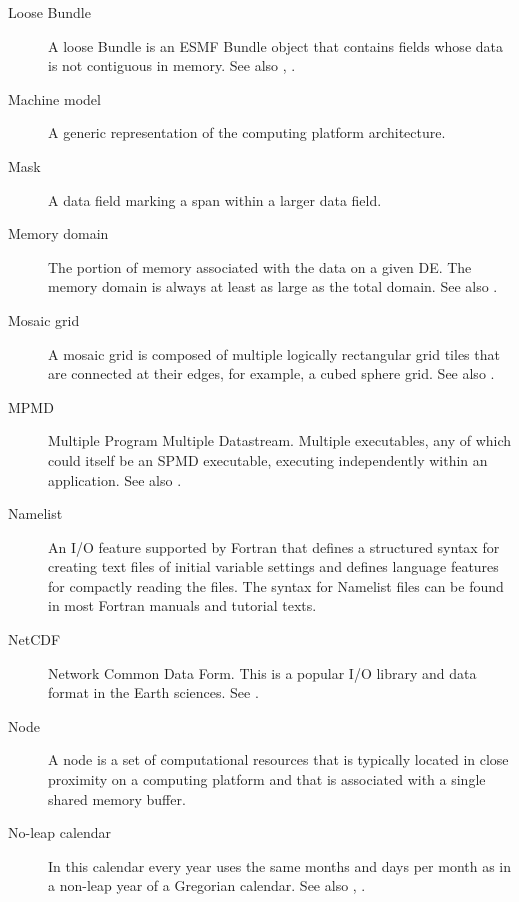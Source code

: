 \begin{description}
\label{glos:LooseBundle} 
\item[Loose Bundle] 
  A loose Bundle 
  is an ESMF Bundle object that contains fields whose data is 
  not contiguous in memory.  See also ,
  .

\item[Machine model] A generic representation of the computing 
  platform architecture.

\label{glos:Mask} 
\item[Mask] 
  A data field marking a span within a larger data field.

\label{glos:MemDomain} 
\item[Memory domain] 
  The portion of memory associated with the data on a given DE.  
  The memory domain is always at least 
  as large as the total domain.  See also .

\label{glos:MosaicGrid}
\item[Mosaic grid]
  A mosaic grid is composed of multiple logically rectangular
  grid tiles that are connected at their edges, for example, a cubed sphere
  grid.  See also .

\label{glos:MPMD} 
\item[MPMD] 
  Multiple Program Multiple Datastream.
  Multiple executables, any of which could itself be an SPMD
  executable, executing independently within an application. 
  See also .

\label{glos:Namelist}
\item[Namelist]
An I/O feature supported by Fortran that
defines a structured syntax for creating text files of initial variable
settings and defines language features for compactly reading the files.
The syntax for Namelist files can be found in most Fortran manuals 
and tutorial texts.

\label{glos:NetCDF}
\item[NetCDF]
  Network Common Data Form.  This is a popular I/O library and data format
in the Earth sciences. See . 

\label{glos:Node} 
\item[Node] 
  A node is a set of computational resources
  that is typically located in close proximity on a computing platform
  and that is associated with a single shared memory buffer.

\label{glos:NoLeap} 
\item [No-leap calendar] 
  In this calendar every year uses the same months 
  and days per month as in a non-leap year of a Gregorian calendar.  See
  also , .


\end{description}
